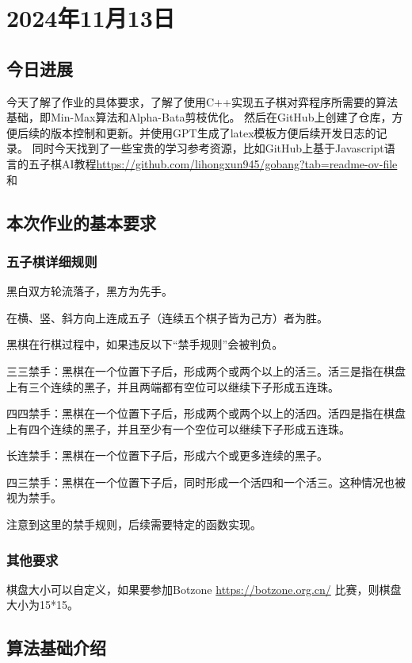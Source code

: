 \section{2024年11月13日} %

\subsection{今日进展} %
今天了解了作业的具体要求，了解了使用C++实现五子棋对弈程序所需要的算法基础，即Min-Max算法和Alpha-Bata剪枝优化。
然后在GitHub上创建了仓库，方便后续的版本控制和更新。并使用GPT生成了latex模板方便后续开发日志的记录。
同时今天找到了一些宝贵的学习参考资源，比如GitHub上基于Javascript语言的五子棋AI教程\url{https://github.com/lihongxun945/gobang?tab=readme-ov-file}和

\subsection{本次作业的基本要求} 

\subsubsection{五子棋详细规则}

黑白双方轮流落子，黑方为先手。

在横、竖、斜方向上连成五子（连续五个棋子皆为己方）者为胜。

黑棋在行棋过程中，如果违反以下“禁手规则”会被判负。

三三禁手：黑棋在一个位置下子后，形成两个或两个以上的活三。活三是指在棋盘上有三个连续的黑子，并且两端都有空位可以继续下子形成五连珠。

四四禁手：黑棋在一个位置下子后，形成两个或两个以上的活四。活四是指在棋盘上有四个连续的黑子，并且至少有一个空位可以继续下子形成五连珠。

长连禁手：黑棋在一个位置下子后，形成六个或更多连续的黑子。

四三禁手：黑棋在一个位置下子后，同时形成一个活四和一个活三。这种情况也被视为禁手。

注意到这里的禁手规则，后续需要特定的函数实现。

\subsubsection{其他要求}
棋盘大小可以自定义，如果要参加Botzone \url{https://botzone.org.cn/} 比赛，则棋盘大小为15*15。

\subsection{算法基础介绍}

